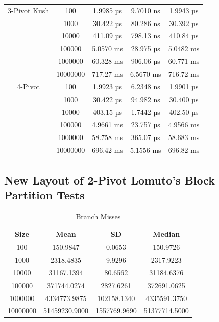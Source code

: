 \documentclass[a4paper,oneside,12pt]{book}
\begin{document}
\begin{center}
    \small
    \begin{tabular}{ | c c | c c c| }
        \hline
        3-Pivot Kush    & 100      & 1.9985 µs    & 9.7010 ns   & 1.9943 µs \\
                        & 1000     & 30.422 µs    & 80.286 ns   & 30.392 µs \\
                        & 10000    & 411.09 µs    & 798.13 ns   & 410.84 µs \\
                        & 100000   & 5.0570 ms    & 28.975 µs   & 5.0482 ms \\
                        & 1000000  & 60.328 ms    & 906.06 µs   & 60.771 ms \\
                        & 10000000 & 717.27 ms    & 6.5670 ms   & 716.72 ms \\
        \hline
        4-Pivot         & 100      & 1.9923 µs    &	6.2348 ns   & 1.9901 µs \\
                        & 1000     & 30.422 µs    &	94.982 ns   & 30.400 µs \\
                        & 10000    & 403.15 µs    & 1.7442 µs   & 402.50 µs \\
                        & 100000   & 4.9661 ms    & 23.757 µs   & 4.9566 ms \\
                        & 1000000  & 58.758 ms    & 365.07 µs 	& 58.683 ms \\
                        & 10000000 & 696.42 ms    & 5.1556 ms   & 696.82 ms \\
        \hline
    \end{tabular}

\end{center}



\subsection{New Layout of 2-Pivot Lomuto's Block Partition Tests}

\small
\begin{table}[H]
    \centering
    \small
    \caption{Branch Misses}
    \vspace{1em}
    \begin{tabular}{ | c | c c c| }
        \hline
        Size     & Mean           & SD            & Median \\
        \hline
        100      & 150.9847       & 0.0653        & 150.9726 \\
        1000     & 2318.4835      & 9.9296        & 2317.9223 \\
        10000    & 31167.1394     & 80.6562       & 31184.6376 \\
        100000   & 371744.0274    & 2827.6261     & 372691.0625 \\
        1000000  & 4334773.9875   & 102158.1340   & 4335591.3750 \\
        10000000 & 51459230.9000  & 1557769.9690  & 51377714.5000 \\
        \hline
    \end{tabular}
\end{table}
\end{document}
